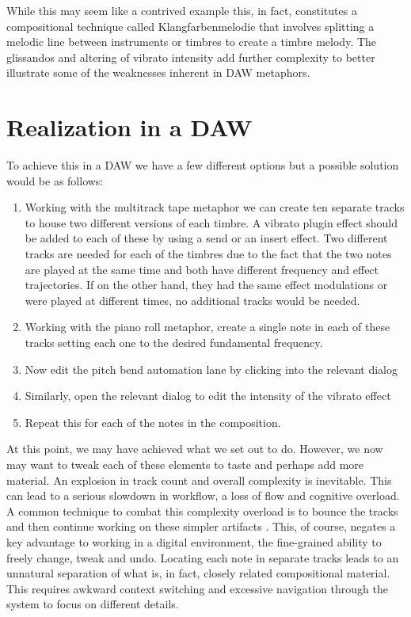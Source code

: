 \documentclass[12pt]{report}
\begin{document}
While this may seem like a contrived example this, in fact, constitutes a
compositional technique called Klangfarbenmelodie that involves splitting a
melodic line between instruments or timbres to create a timbre melody. The
glissandos and altering of vibrato intensity add further complexity to better
illustrate some of the weaknesses inherent in DAW metaphors.

\section{Realization in a DAW}
\label{sec:org861cc88}
To achieve this in a DAW we have a few different options but a possible solution
would be as follows:
\begin{enumerate}
\item Working with the multitrack tape metaphor we can create ten separate tracks
to house two different versions of each timbre. A vibrato plugin effect
should be added to each of these by using a send or an insert effect. Two
different tracks are needed for each of the timbres due to the fact that the
two notes are played at the same time and both have different frequency and
effect trajectories. If on the other hand, they had the same effect
modulations or were played at different times, no additional tracks would be
needed.
\item Working with the piano roll metaphor, create a single note in each of these
tracks setting each one to the desired fundamental frequency.
\item Now edit the pitch bend automation lane by clicking into the relevant dialog
\item Similarly, open the relevant dialog to edit the intensity of the vibrato effect
\item Repeat this for each of the notes in the composition.
\end{enumerate}

At this point, we may have achieved what we set out to do. However, we now may
want to tweak each of these elements to taste and perhaps add more material. An
explosion in track count and overall complexity is inevitable. This can lead to
a serious slowdown in workflow, a loss of flow and cognitive overload. A common
technique to combat this complexity overload is to bounce the tracks and then
continue working on these simpler artifacts \cite{duignan_computer_2008}. This,
of course, negates a key advantage to working in a digital environment, the
fine-grained ability to freely change, tweak and undo. Locating each note in
separate tracks leads to an unnatural separation of what is, in fact, closely
related compositional material. This requires awkward context switching and
excessive navigation through the system to focus on different details.
\end{document}
